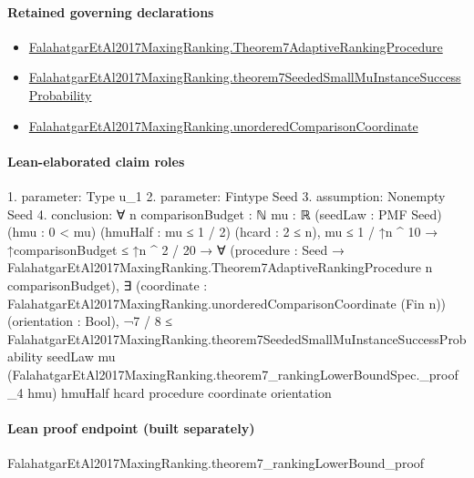 \documentclass[10pt]{article}
\begin{document}
\paragraph{Retained governing declarations}
\begin{itemize}\raggedright
\item \hyperlink{governing-declaration-3610c7209777157b}{Falahatgar\allowbreak{}Et\allowbreak{}Al2017\allowbreak{}Maxing\allowbreak{}Ranking.\allowbreak{}Theorem7\allowbreak{}Adaptive\allowbreak{}Ranking\allowbreak{}Procedure}
\item \hyperlink{governing-declaration-c482096b9441d903}{Falahatgar\allowbreak{}Et\allowbreak{}Al2017\allowbreak{}Maxing\allowbreak{}Ranking.\allowbreak{}theorem7\allowbreak{}Seeded\allowbreak{}Small\allowbreak{}Mu\allowbreak{}Instance\allowbreak{}Success\allowbreak{}Probability}
\item \hyperlink{governing-declaration-ef3a9f7f7c488790}{Falahatgar\allowbreak{}Et\allowbreak{}Al2017\allowbreak{}Maxing\allowbreak{}Ranking.\allowbreak{}unordered\allowbreak{}Comparison\allowbreak{}Coordinate}
\end{itemize}
\paragraph{Lean-elaborated claim roles}\begin{ReviewVerbatim}
1. parameter: Type u_1
2. parameter: Fintype Seed
3. assumption: Nonempty Seed
4. conclusion: ∀ {n comparisonBudget : ℕ} {mu : ℝ} (seedLaw : PMF Seed) (hmu : 0 < mu) (hmuHalf : mu ≤ 1 / 2) (hcard : 2 ≤ n),
  mu ≤ 1 / ↑n ^ 10 →
    ↑comparisonBudget ≤ ↑n ^ 2 / 20 →
      ∀ (procedure : Seed → FalahatgarEtAl2017MaxingRanking.Theorem7AdaptiveRankingProcedure n comparisonBudget),
        ∃ (coordinate : FalahatgarEtAl2017MaxingRanking.unorderedComparisonCoordinate (Fin n)) (orientation : Bool),
          ¬7 / 8 ≤
              FalahatgarEtAl2017MaxingRanking.theorem7SeededSmallMuInstanceSuccessProbability seedLaw mu
                (FalahatgarEtAl2017MaxingRanking.theorem7_rankingLowerBoundSpec._proof_4 hmu) hmuHalf hcard procedure
                coordinate orientation
\end{ReviewVerbatim}

\paragraph{Lean proof endpoint (built separately)}\begin{ReviewVerbatim}
FalahatgarEtAl2017MaxingRanking.theorem7_rankingLowerBound_proof
\end{ReviewVerbatim}
\end{document}
